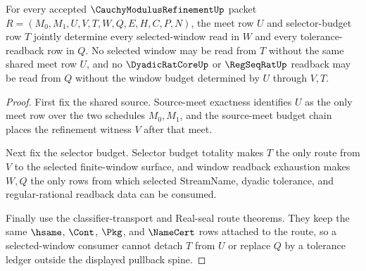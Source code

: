\begin{theorem}
\label{thm:cauchy-modulus-refinement-shared-budget-pullback}
For every accepted $\CauchyModulusRefinementUp$ packet $R=(M_0,M_1,U,V,T,W,Q,E,H,C,P,N)$, the meet row $U$ and selector-budget row $T$ jointly determine every selected-window read in $W$ and every tolerance-readback row in $Q$. No selected window may be read from $T$ without the same shared meet row $U$, and no $\DyadicRatCoreUp$ or $\RegSeqRatUp$ readback may be read from $Q$ without the window budget determined by $U$ through $V,T$.
\end{theorem}
\begin{proof}
First fix the shared source. Source-meet exactness identifies $U$ as the only meet row over the two schedules $M_0,M_1$, and the source-meet budget chain places the refinement witness $V$ after that meet.

Next fix the selector budget. Selector budget totality makes $T$ the only route from $V$ to the selected finite-window surface, and window readback exhaustion makes $W,Q$ the only rows from which selected StreamName, dyadic tolerance, and regular-rational readback data can be consumed.

Finally use the classifier-transport and Real-seal route theorems. They keep the same $\hsame$, $\Cont$, $\Pkg$, and $\NameCert$ rows attached to the route, so a selected-window consumer cannot detach $T$ from $U$ or replace $Q$ by a tolerance ledger outside the displayed pullback spine.
\end{proof}

